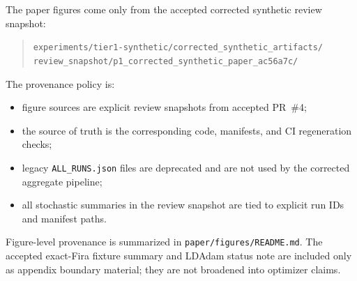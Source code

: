The paper figures come only from the accepted corrected synthetic review
snapshot:
\begin{quote}
\texttt{experiments/tier1-synthetic/corrected\_synthetic\_artifacts/}\\
\texttt{review\_snapshot/p1\_corrected\_synthetic\_paper\_ac56a7c/}
\end{quote}

The provenance policy is:
\begin{itemize}
\item figure sources are explicit review snapshots from accepted PR~\#4;
\item the source of truth is the corresponding code, manifests, and CI
regeneration checks;
\item legacy \texttt{ALL\_RUNS.json} files are deprecated and are not used by
the corrected aggregate pipeline;
\item all stochastic summaries in the review snapshot are tied to explicit run
IDs and manifest paths.
\end{itemize}

Figure-level provenance is summarized in \texttt{paper/figures/README.md}. The
accepted exact-Fira fixture summary and LDAdam status note are included only as
appendix boundary material; they are not broadened into optimizer claims.
